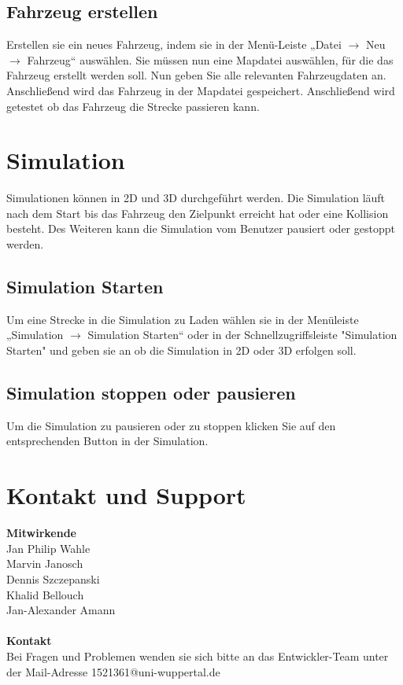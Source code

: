 \documentclass[11pt,a4paper]{article}
\begin{document}
\subsection{Fahrzeug erstellen}
Erstellen sie ein neues Fahrzeug, indem sie in der Menü-Leiste „Datei $\rightarrow$ Neu $\rightarrow$ Fahrzeug“ auswählen. Sie müssen nun eine Mapdatei auswählen, für die das Fahrzeug erstellt werden soll. Nun geben Sie alle relevanten Fahrzeugdaten an. Anschließend wird das Fahrzeug in der Mapdatei gespeichert. Anschließend wird getestet ob das Fahrzeug die Strecke passieren kann.
\newpage
\section{Simulation}
Simulationen können in 2D und 3D durchgeführt werden. Die Simulation läuft nach dem Start bis das Fahrzeug den Zielpunkt erreicht hat oder eine Kollision besteht.
Des Weiteren kann die Simulation vom Benutzer pausiert oder gestoppt werden.

\subsection{Simulation Starten}
Um eine Strecke in die Simulation zu Laden wählen sie in der Menüleiste „Simulation $\rightarrow$ Simulation Starten“ oder in der Schnellzugriffsleiste "Simulation Starten" und geben sie an ob die Simulation in 2D oder 3D erfolgen soll.
\subsection{Simulation stoppen oder pausieren}
Um die Simulation zu pausieren oder zu stoppen klicken Sie auf den entsprechenden Button in der Simulation.
\newpage
\section{Kontakt und Support}
\textbf{Mitwirkende} \\ 
Jan Philip Wahle \\
Marvin Janosch \\
Dennis Szczepanski \\
Khalid Bellouch \\
Jan-Alexander Amann \\
\\
\textbf{Kontakt} \\ 
Bei Fragen und Problemen wenden sie sich bitte an das Entwickler-Team unter der Mail-Adresse 1521361@uni-wuppertal.de
\end{document}
